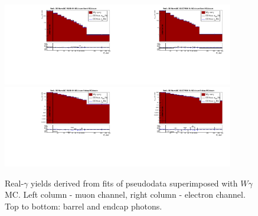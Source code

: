  \begin{figure}[htb]
  \begin{center}
   \includegraphics[width=0.45\textwidth]{../figs/figs_v11/MUON_WGamma/MCclosureWjetsPlusWg/c_TrueDDvsMC_c_MUON_WGamma__UNblind_MCclosure__Barrel__phoEt_MCclosure.pdf}\includegraphics[width=0.45\textwidth]{../figs/figs_v11/ELECTRON_WGamma/MCclosureWjetsPlusWg/c_TrueDDvsMC_c_ELECTRON_WGamma__UNblind_MCclosure__Barrel__phoEt_MCclosure.pdf}
   \includegraphics[width=0.45\textwidth]{../figs/figs_v11/MUON_WGamma/MCclosureWjetsPlusWg/c_TrueDDvsMC_c_MUON_WGamma__UNblind_MCclosure__Endcap__phoEt_MCclosure.pdf}\includegraphics[width=0.45\textwidth]{../figs/figs_v11/ELECTRON_WGamma/MCclosureWjetsPlusWg/c_TrueDDvsMC_c_ELECTRON_WGamma__UNblind_MCclosure__Endcap__phoEt_MCclosure.pdf}
  \caption{Real-$\gamma$ yields derived from fits of pseudodata superimposed with $W\gamma$ MC. Left column - muon channel, right column - electron channel. Top to bottom: barrel and endcap photons.}
  \label{fig:TrueDDvsMC_MCclosureWjetsPlusWg}
  \end{center}
\end{figure}

